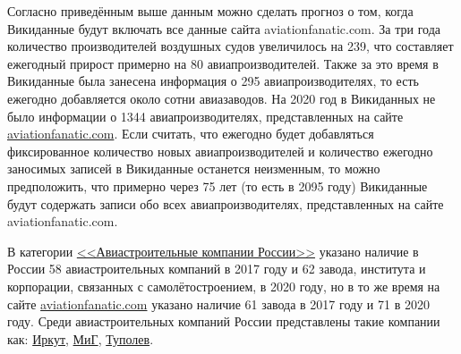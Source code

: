 
Согласно приведённым выше данным можно сделать прогноз о том, когда Викиданные будут включать все данные сайта aviationfanatic.com. За три года количество производителей воздушных судов увеличилось на 239, что составляет ежегодный прирост примерно на 80 авиапроизводителей. Также за это время в Викиданные была занесена информация о 295 авиапроизводителях, то есть ежегодно добавляется около сотни авиазаводов. На 2020 год в Викиданных не было информации о \num{1344} авиапроизводителях, представленных на сайте \href{https://www.aviationfanatic.com/}{aviationfanatic.com}. Если считать, что ежегодно будет добавляться фиксированное количество новых авиапроизводителей и количество ежегодно заносимых записей в Викиданные останется неизменным, то можно предположить, что примерно через 75 лет (то есть в 2095 году) Викиданные будут содержать записи обо всех авиапроизводителях, представленных на сайте aviationfanatic.com.


В категории \href{https://cutt.ly/NhrKnWn}{<<Авиастроительные компании России>>} указано наличие в России 58 авиастроительных компаний в 2017 году и 62 завода, института и корпорации, связанных с самолётостроением, в 2020 году, но в то же время на сайте \href{https://www.aviationfanatic.com/}{aviationfanatic.com} указано наличие 61 завода\cite{count_plants_of_aircrafts} в 2017 году и 71 в 2020 году. Среди авиастроительных компаний России представлены такие компании как: \href{https://clck.ru/RxFCs}{Иркут}, \href{https://clck.ru/QR6qZ}{МиГ}, \href{https://clck.ru/RxFG3}{Туполев}.




